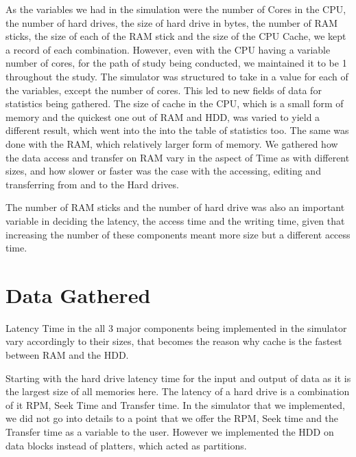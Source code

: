 \documentclass[12pt]{article}
\begin{document}
As the variables we had in the simulation were the number of Cores in the CPU,
the number of hard drives, the size of hard drive in bytes, the number of RAM sticks, the size of
each of the RAM stick and the size of the CPU Cache, we kept a record of each combination. However,
even with the CPU having a variable number of cores, for the path of study being conducted, we maintained
it to be 1 throughout the study. The simulator was structured to take in a value for each of the variables,
except the number of cores. This led to new fields of data for statistics being gathered.
The size of cache in the CPU, which is a small form of memory and the quickest one out of RAM and HDD, was
varied to yield a different result, which went into the into the table of statistics too.
The same was done with the RAM, which relatively larger form of memory. We gathered how the data access
and transfer on RAM vary in the aspect of Time as with different sizes, and how slower or faster was the case
with the accessing, editing and transferring from and to the Hard drives.

The number of RAM sticks and the number of hard drive was also an important variable in deciding the latency,
the access time and the writing time, given that increasing the number of these components meant more
size but a different access time.

\section{Data Gathered}
\label{sec:data}

Latency Time in the all 3 major components being implemented in the simulator vary accordingly to their sizes,
that becomes the reason why cache is the fastest between RAM and the HDD.

Starting with the hard drive latency time for the input and output of data as it is the largest size of all memories here.
The latency of a hard drive is a combination of it RPM, Seek Time and Transfer time. In the simulator that we
implemented, we did not go into details to a point that we offer the RPM, Seek time and the Transfer time as
a variable to the user. However we implemented the HDD on data blocks instead of platters, which acted as
partitions. 
\end{document}
